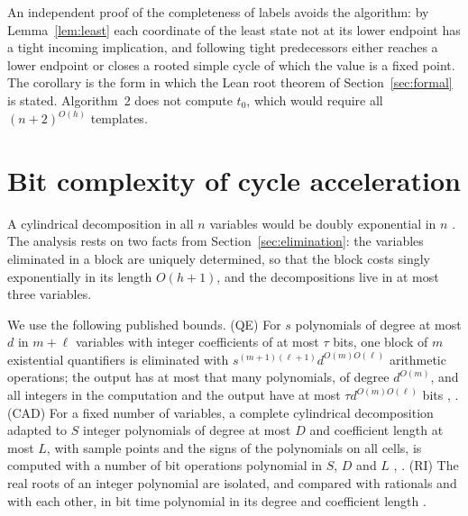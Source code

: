 \documentclass[11pt,a4paper]{article}
\theoremstyle{plain}
\theoremstyle{definition}
\theoremstyle{remark}
\begin{document}
An independent proof of the completeness of labels avoids the algorithm: by Lemma~\ref{lem:least} each coordinate of the least state not at its lower endpoint has a tight incoming implication, and following tight predecessors either reaches a lower endpoint or closes a rooted simple cycle of which the value is a fixed point. The corollary is the form in which the Lean root theorem of Section~\ref{sec:formal} is stated. Algorithm~2 does not compute $t_0$, which would require all $(n+2)^{O(h)}$ templates.

\section{Bit complexity of cycle acceleration}\label{sec:complexity}

A cylindrical decomposition in all $n$ variables would be doubly exponential in $n$ \citep{davenport1988}. The analysis rests on two facts from Section~\ref{sec:elimination}: the variables eliminated in a block are uniquely determined, so that the block costs singly exponentially in its length $O(h+1)$, and the decompositions live in at most three variables.

We use the following published bounds. (QE) For $s$ polynomials of degree at most $d$ in $m+\ell$ variables with integer coefficients of at most $\tau$ bits, one block of $m$ existential quantifiers is eliminated with $s^{(m+1)(\ell+1)}d^{O(m)O(\ell)}$ arithmetic operations; the output has at most that many polynomials, of degree $d^{O(m)}$, and all integers in the computation and the output have at most $\tau d^{O(m)O(\ell)}$ bits \citep[Theorem 2.27]{basu2014}, \citep[Chapter 14]{bpr2006}. (CAD) For a fixed number of variables, a complete cylindrical decomposition adapted to $S$ integer polynomials of degree at most $D$ and coefficient length at most $L$, with sample points and the signs of the polynomials on all cells, is computed with a number of bit operations polynomial in $S$, $D$ and $L$ \citep{collins1975}, \citep[Chapter 11]{bpr2006}. (RI) The real roots of an integer polynomial are isolated, and compared with rationals and with each other, in bit time polynomial in its degree and coefficient length \citep{sagraloff2016,bpr2006}.
\end{document}
